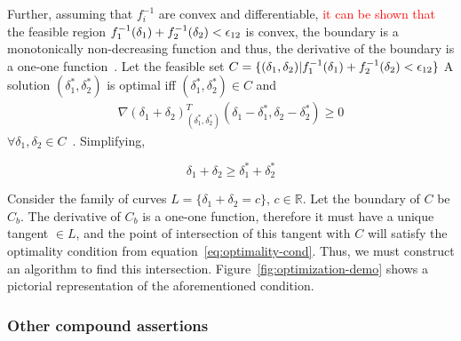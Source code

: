 Further, assuming that $f_i^{-1}$ are convex and differentiable, \textcolor{red}{it can be shown that} the feasible region $f_1^{-1}(\delta_1) + f_2^{-1}(\delta_2) < \epsilon_{12}$ is convex, the boundary is a monotonically non-decreasing function and thus, the derivative of the boundary is a one-one function~\cite{bertsekas1997nonlinear}. 
Let the feasible set  $C = \{(\delta_1, \delta_2)| f_1^{-1}(\delta_1) + f_2^{-1}(\delta_2) < \epsilon_{12}  \}$
A solution $(\delta_1^*, \delta_2^*)$ is optimal iff $(\delta_1^*, \delta_2^*) \in C$ and 
\begin{align*}
    \nabla(\delta_1 + \delta_2)_{(\delta_1^*, \delta_2^*)}^T(\delta_1 - \delta_1^*, \delta_2 - \delta_2^*) \geq 0
\end{align*}
$\forall \delta_1, \delta_2 \in C$~\cite{bertsekas1997nonlinear}. Simplifying,

\begin{equation}
\delta_1 + \delta_2 \geq \delta_1^* + \delta_2^*    
\label{eq:optimality-cond}
\end{equation}

Consider the family of curves $L = \{\delta_1 + \delta_2 = c\}$, $c\in \mathbb{R}$. 
Let the boundary of $C$ be $C_b$.
The derivative of $C_b$ is a one-one function, therefore it must have a unique tangent $\in L$, and the point of intersection of this tangent with $C$ will satisfy the optimality condition from equation~\ref{eq:optimality-cond}. 
Thus, we must construct an algorithm to find this intersection. Figure~\ref{fig:optimization-demo} shows a pictorial representation of the aforementioned condition. 

\subsubsection{Other compound assertions}

